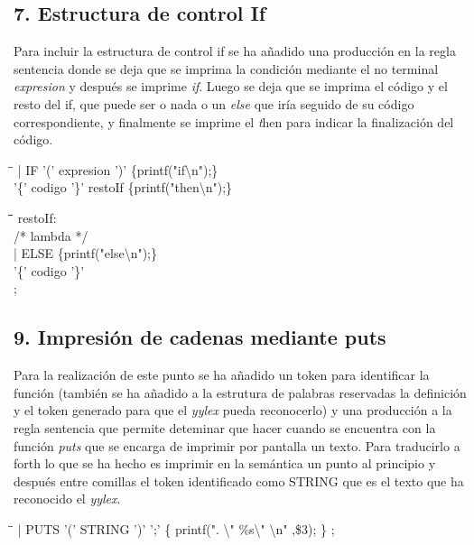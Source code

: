 \documentclass[11pt,spanish]{article}
\begin{document}
		\subsection*{7. Estructura de control If}
		\label{subsec:7}
		Para incluir la estructura de control if se ha añadido una producción en la regla {\ttfamily sentencia} donde se deja que se imprima la condición mediante el no terminal \textit {expresion} y después se imprime \textit {if}. Luego se deja que se imprima el código y el resto del if, que puede ser o nada o un \textit {else} que iría seguido de su código correspondiente, y finalmente se imprime el {\textit then} para indicar la finalización del código.
		\begin{tcolorbox}
		\begin{tabbing}
			\hspace*{1cm}\= \hspace*{8cm}\=\kill
			| IF '(' expresion ')'\>\> \{printf("if\textbackslash n");\}\\
			\>'\{' codigo '\}' restoIf\> \{printf("then\textbackslash n");\}
		\end{tabbing}
		\end{tcolorbox}
		\begin{tcolorbox}
		\begin{tabbing}
			\hspace*{1cm}\=\hspace*{1cm}\= \hspace*{8cm}\=\kill
			restoIf:\\
			\>/* lambda */ \\
			\>| ELSE\>\> \{printf("else\textbackslash n");\}\\
			\>\>'\{' codigo '\}'\\
			;
		\end{tabbing}
		\end{tcolorbox}
		\subsection*{9. Impresión de cadenas mediante puts}
		\label{subsec:9}
		\addcontentsline{toc}{subsection}{\nameref{subsec:9}}
		Para la realización de este punto se ha añadido un token para identificar la función (también se ha añadido a la estrutura de palabras reservadas la definición y el token generado para que el \textit {yylex} pueda reconocerlo) y una producción a la regla {\ttfamily sentencia} que permite deteminar que hacer cuando se encuentra con la función \textit {puts} que se encarga de imprimir por pantalla un texto. Para traducirlo a forth lo que se ha hecho es imprimir en la semántica un punto al principio y después entre comillas el token identificado como STRING que es el texto que ha reconocido el \textit {yylex}.
		\begin{tcolorbox}
		\begin{tabbing}
			\hspace*{1cm}\= \hspace*{4cm}\=\kill
			| PUTS '(' STRING ')' ';'\> \>		\{ printf(". \textbackslash "  \%s\textbackslash " \textbackslash n" ,\$3); \}
			;
		\end{tabbing}
		\end{tcolorbox}
\end{document}
